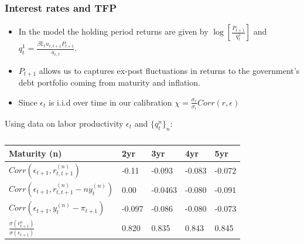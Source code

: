 \documentclass{beamer}
\begin{document}
\begin{frame}
 \frametitle{ Interest rates and TFP}
 \small
 \begin{itemize}
  \item In the model the holding period returns are given by $\log\left[\frac{P_{t+1}}{q^{1}_{t}}\right]$ and $q^{1}_t=\frac{\beta \mathbb{E}_tu_{c,t+1}P_{t+1}}{u_{c,t}}$. 
\item $P_{t+1}$ allows us to captures ex-post fluctuations in returns to the government's debt  portfolio coming from maturity and inflation. 
\item Since $\epsilon_{t}$ is i.i.d over time in our calibration  $\chi=\frac{\sigma_{r}}{\sigma_{\epsilon}} Corr(r,\epsilon)$
 \end{itemize}

 Using data on labor productivity $\epsilon_{t}$ and $\{q^{n}_t\}_{n}$:
 
\begin{table}[htp]
\small
\begin{tabular}{|l|l| l|l|l|}
\hline
Maturity (n) &2yr & 3yr & 4yr & 5yr\\
\hline
$Corr(\epsilon_{t+1},r^{(n)}_{t,t+1})$ & -0.11 &-0.093 &-0.083 &-0.072\\
$Corr(\epsilon_{t+1},r^{(n)}_{t,t+1}-ny^{(n)}_{t})$& 0.00 & -0.0463 &-0.080& -0.091\\
$Corr(\epsilon_{t+1},y^{(n)}_{t}-\pi_{t+1})$ &-0.097  &-0.086  &-0.080  &-0.073 \\ 
$\frac{\sigma({r^{n}_{t+1}})}{\sigma({\epsilon_{t+1}})}$  &0.820  &0.835  &0.843  &0.845\\ 

\hline
\end{tabular}
\caption{}
\label{tab:corr}
\end{table}
 
\end{frame}
\end{document}

